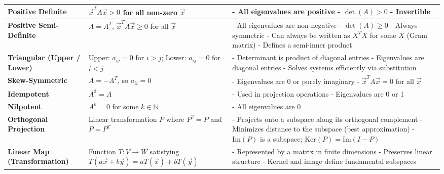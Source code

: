 \documentclass[12pt]{article}
\begin{document}
\begin{adjustwidth}{-1cm}{-2cm}
\begin{longtable}{|>{\bfseries}m{3.5cm}|m{5cm}|m{10.5cm}|}
				\hline
				Positive Definite & $\vec{x}^T A \vec{x} > 0$ for all non-zero $\vec{x}$ &
				- All eigenvalues are positive \newline
				- $\det(A) > 0$ \newline
				- Invertible \\
				\hline
				Positive Semi-Definite & $A = A^T$, $\vec{x}^T A \vec{x} \ge 0$ for all $\vec{x}$ &
				- All eigenvalues are non-negative \newline
				- $\det(A) \ge 0$ \newline
				- Always symmetric \newline
				- Can always be written as $X^T X$ for some $X$ (Gram matrix) \newline
				- Defines a semi-inner product \\
				\hline
				Triangular (Upper / Lower) &
				Upper: $a_{ij} = 0$ for $i > j$; Lower: $a_{ij} = 0$ for $i < j$ &
				- Determinant is product of diagonal entries \newline
				- Eigenvalues are diagonal entries \newline
				- Solves systems efficiently via substitution \\
				\hline
				Skew-Symmetric & $A = -A^T$, so $a_{ii} = 0$ &
				- Eigenvalues are 0 or purely imaginary \newline
				- $\vec{x}^T A \vec{x} = 0$ for all $\vec{x}$ \\
				\hline
				Idempotent & $A^2 = A$ &
				- Used in projection operations \newline
				- Eigenvalues are 0 or 1 \\
				\hline
				Nilpotent & $A^k = 0$ for some $k \in \mathbb{N}$ &
				- All eigenvalues are 0 \\
				\hline
				\hline
				Orthogonal Projection & Linear transformation $P$ where $P^2 = P$
				and $P = P^T$ &
				- Projects onto a subspace along its orthogonal complement \newline
				- Minimizes distance to the subspace (best approximation) \newline
				- $\text{Im}(P)$ is a subspace; $\text{Ker}(P) = \text{Im}(I - P)$ \\
				\hline
				Linear Map (Transformation) & Function $T: V \rightarrow W$
				satisfying $T(a\vec{x} + b\vec{y}) = aT(\vec{x}) + bT(\vec{y})$ &
				- Represented by a matrix in finite dimensions \newline
				- Preserves linear structure \newline
				- Kernel and image define fundamental subspaces \\

\end{longtable}
\end{adjustwidth}
\end{document}
